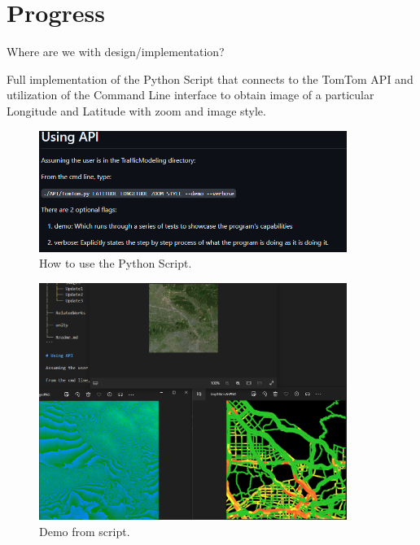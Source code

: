 \section{Progress}

Where are we with design/implementation?

Full implementation of the Python Script that connects to the TomTom API and utilization of the Command Line interface to obtain image of a particular Longitude and Latitude with zoom and image style.

\begin{figure}[!ht]
    \centering
    \includegraphics[width=10cm]{../Images/Update4/APIInstructions.png}
       \caption{How to use the Python Script.}
           \label{Fig:ConversionFunction}
\end{figure}

\begin{figure}[!ht]
    \centering
    \includegraphics[width=10cm]{../Images/Update4/DemoAPI.png}
       \caption{Demo from script.}
           \label{Fig:ConversionFunction}
\end{figure}
